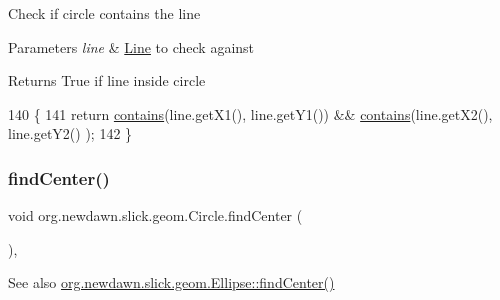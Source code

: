 Check if circle contains the line 
\begin{DoxyParams}{Parameters}
{\em line} & \mbox{\hyperlink{classorg_1_1newdawn_1_1slick_1_1geom_1_1_line}{Line}} to check against \\
\hline
\end{DoxyParams}
\begin{DoxyReturn}{Returns}
True if line inside circle 
\end{DoxyReturn}

\begin{DoxyCode}
140                                         \{ 
141          \textcolor{keywordflow}{return} \mbox{\hyperlink{classorg_1_1newdawn_1_1slick_1_1geom_1_1_circle_aaab616d4b6e3009c427c96126f25aeb2}{contains}}(line.getX1(), line.getY1()) && \mbox{\hyperlink{classorg_1_1newdawn_1_1slick_1_1geom_1_1_circle_aaab616d4b6e3009c427c96126f25aeb2}{contains}}(line.getX2(), line.getY2()
      ); 
142     \}
\end{DoxyCode}
\mbox{\label{classorg_1_1newdawn_1_1slick_1_1geom_1_1_circle_ad3edf9b271a6418140800ce60a62132a}} 
\subsubsection{\texorpdfstring{find\+Center()}{findCenter()}}
{\footnotesize\ttfamily void org.\+newdawn.\+slick.\+geom.\+Circle.\+find\+Center (\begin{DoxyParamCaption}{ }\end{DoxyParamCaption})\hspace{0.3cm}{\ttfamily [inline]}, {\ttfamily [protected]}}

\begin{DoxySeeAlso}{See also}
\mbox{\hyperlink{classorg_1_1newdawn_1_1slick_1_1geom_1_1_ellipse_a89903a1b75e22f6c308640cc2c05e252}{org.\+newdawn.\+slick.\+geom.\+Ellipse\+::find\+Center()}} 
\end{DoxySeeAlso}

